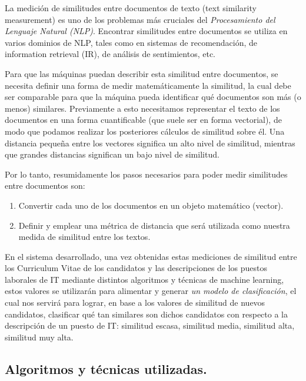 \documentclass[12pt,a4paper]{article}
\begin{document}
\begin{sloppypar}
La medición de similitudes entre documentos de texto (text similarity measurement) es uno de los problemas más cruciales del \textit{Procesamiento del Lenguaje Natural (NLP)}. Encontrar similitudes entre documentos se utiliza en varios dominios de NLP, tales como en sistemas de recomendación, de information retrieval (IR), de análisis de sentimientos, etc.\cite{Similarity_calculation}

Para que las máquinas puedan describir esta similitud entre documentos, se necesita definir una forma de medir matemáticamente la similitud, la cual debe ser comparable para que la máquina pueda identificar qué documentos son más (o menos) similares. Previamente a esto necesitamos representar el texto de los documentos en una forma cuantificable (que suele ser en forma vectorial), de modo que podamos realizar los posteriores cálculos de similitud sobre él. Una distancia pequeña entre los vectores significa un alto nivel de similitud, mientras que grandes distancias significan un bajo nivel de similitud\cite{Similarity_calculation}.

Por lo tanto, resumidamente los pasos necesarios para poder medir similitudes entre documentos son\cite{Similarity_calculation}:
\begin{enumerate}
\item Convertir cada uno de los documentos en un objeto matemático (vector).
\item Definir y emplear una métrica de distancia que será utilizada como nuestra medida de similitud entre los textos.
\end{enumerate}

\cleardoublepage    %

En el sistema desarrollado, una vez obtenidas estas mediciones de similitud entre los Curriculum Vitae de los candidatos y las descripciones de los puestos laborales de IT mediante distintos algoritmos y técnicas de machine learning, estos valores se utilizarán para alimentar y generar \textit{un modelo de clasificación}, el cual nos servirá para lograr, en base a los valores de similitud de nuevos candidatos, clasificar qué tan similares son dichos candidatos con respecto a la descripción de un puesto de IT: similitud escasa, similitud media, similitud alta, similitud muy alta.\\

\subsection{Algoritmos y técnicas utilizadas.}


\end{sloppypar}
\end{document}
